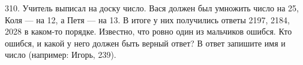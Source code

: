 310. Учитель выписал на доску число. Вася должен был умножить число на 25, Коля --- на 12, а Петя --- на 13. В итоге у них получились ответы 2197, 2184, 2028 в каком-то порядке. Известно, что ровно один из мальчиков ошибся. Кто ошибся, и какой у него должен быть верный ответ? В ответ запишите имя и число (например: Игорь, 239).\\
